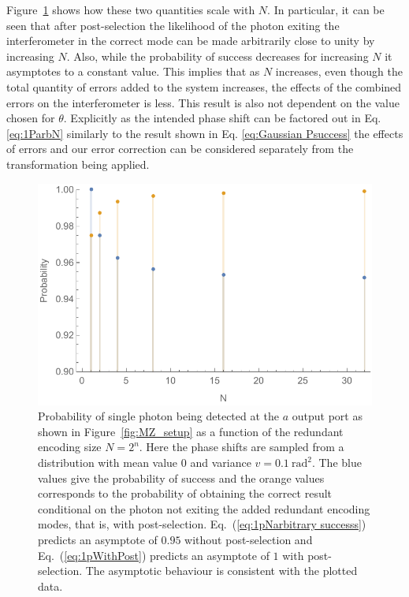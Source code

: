 \documentclass[aps,pra,twocolumn,superscriptaddress,numerical,floatfix]{revtex4-1}
\begin{document}
Figure~\ref{fig:post vs no post} shows how these two quantities scale with $N$. In particular, it can be seen that after post-selection the likelihood of the photon exiting the interferometer in the correct mode can be made arbitrarily close to unity by increasing $N$. Also, while the probability of success decreases for increasing $N$ it asymptotes to a constant value. This implies that as $N$ increases, even though the total quantity of errors added to the system increases, the effects of the combined errors on the interferometer is less. This result is also not dependent on the value chosen for $\theta$. Explicitly as the intended phase shift can be factored out in Eq. \ref{eq:1ParbN} similarly to the result shown in Eq. \ref{eq:Gaussian Psuccess} the effects of errors and our error correction can be considered separately from the transformation being applied.
\begin{figure}[tbh]
	\includegraphics[width=\columnwidth]{1photonpostvsnopost.pdf}
	\caption{\label{fig:post vs no post} Probability of single photon being detected at the $a$ output port as shown in Figure~\ref{fig:MZ_setup} as a function of the redundant encoding size $N=2^n$. Here the phase shifts are sampled from a distribution with mean value $0$ and variance $v=0.1\ \textrm{rad}^{2}$. The blue values give the probability of success and the orange values corresponds to the probability of obtaining the correct result conditional on the photon not exiting the added redundant encoding modes, that is, with post-selection.  Eq.~(\ref{eq:1pNarbitrary successs}) predicts an asymptote of $0.95$ without post-selection and Eq.~(\ref{eq:1pWithPost}) predicts an asymptote of $1$ with post-selection.  The asymptotic behaviour is consistent with the plotted data.}
\end{figure}
\end{document}
